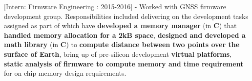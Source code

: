 \noindent \textcolor{ultramarine}{[Intern: Firmware Engineering : 2015-2016]} - Worked with GNSS firmware development group. Responsibilities included delivering on the development tasks assigned as part of which have \textbf{developed a memory manager} (in \textbf{C}) that \textbf{handled memory allocation for a 2kB space}, \textbf{designed and developed a math library} (in \textbf{C}) to \textbf{compute distance between two points over the surface of Earth}, bring up of pre-silicon development \textbf{virtual platforms}, \textbf{static analysis of firmware to compute memory and time requirement} for on chip memory design requirements.\\

